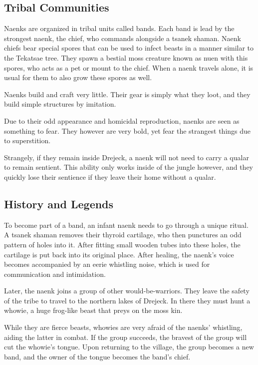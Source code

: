 \begin{linenumbers}
\subsection*{Tribal Communities}

Naenks are organized in tribal units called bands.
Each band is lead by the strongest naenk, the chief, who commands alongside a tsanek shaman.
Naenk chiefs bear special spores that can be used to infect beasts in a manner similar to the Tekatsae tree.
They spawn a bestial moss creature known as nuen with this spores, who acts as a pet or mount to the chief.
When a naenk travels alone, it is usual for them to also grow these spores as well.

Naenks build and craft very little.
Their gear is simply what they loot, and they build simple structures by imitation.

Due to their odd appearance and homicidal reproduction, naenks are seen as something to fear.
They however are very bold, yet fear the strangest things due to superstition.

Strangely, if they remain inside Drejeck, a naenk will not need to carry a qualar to remain sentient.
This ability only works inside of the jungle however, and they quickly lose their sentience if they leave their home without a qualar.

\subsection*{History and Legends}
To become part of a band, an infant naenk needs to go through a unique ritual.
A tsanek shaman removes their thyroid cartilage, who then punctures an odd pattern of holes into it.
After fitting small wooden tubes into these holes, the cartilage is put back into its original place.
After healing, the naenk's voice becomes accompanied by an eerie whistling noise, which is used for communication and intimidation.

Later, the naenk joins a group of other would-be-warriors.
They leave the safety of the tribe to travel to the northern lakes of Drejeck.
In there they must hunt a whowie, a huge frog-like beast that preys on the moss kin.

While they are fierce beasts, whowies are very afraid of the naenks' whistling, aiding the latter in combat.
If the group succeeds, the bravest of the group will cut the whowie's tongue.
Upon returning to the village, the group becomes a new band, and the owner of the tongue becomes the band's chief.


\end{linenumbers}
